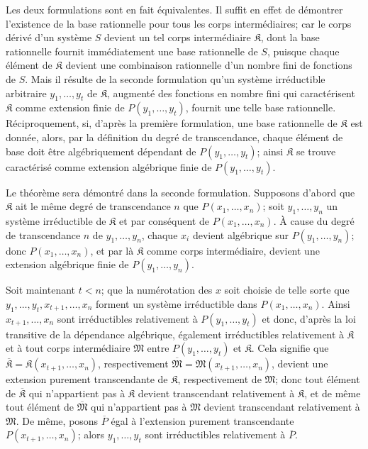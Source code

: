 Les deux formulations sont en fait équivalentes. Il suffit en effet de démontrer l'existence de la base rationnelle pour tous les corps intermédiaires; car le corps dérivé d'un système $S$ devient un tel corps intermédiaire $\mathfrak K$, dont la base rationnelle fournit immédiatement une base rationnelle de $S$, puisque chaque élément de $\mathfrak K$ devient une combinaison rationnelle d'un nombre fini de fonctions de $S$. Mais il résulte de la seconde formulation qu'un système irréductible arbitraire $y_1,\ldots,y_t$ de $\mathfrak K$, augmenté des fonctions en nombre fini qui caractérisent $\mathfrak K$ comme extension finie de $P(y_1,\ldots,y_t)$, fournit une telle base rationnelle. Réciproquement, si, d'après la première formulation, une base rationnelle de $\mathfrak K$ est donnée, alors, par la définition du degré de transcendance, chaque élément de base doit être algébriquement dépendant de $P(y_1,\ldots,y_t)$; ainsi $\mathfrak K$ se trouve caractérisé comme extension algébrique finie de $P(y_1,\ldots,y_t)$.

Le théorème sera démontré dans la seconde formulation. Supposons d'abord que $\mathfrak K$ ait le même degré de transcendance $n$ que $P(x_1,\ldots,x_n)$; soit $y_1,\ldots,y_n$ un système irréductible de $\mathfrak K$ et par conséquent de $P(x_1,\ldots,x_n)$. À cause du degré de transcendance $n$ de $y_1,\ldots,y_n$, chaque $x_i$ devient algébrique sur $P(y_1,\ldots,y_n)$; donc $P(x_1,\ldots,x_n)$, et par là $\mathfrak K$ comme corps intermédiaire, devient une extension algébrique finie de $P(y_1,\ldots,y_n)$.

Soit maintenant $t<n$; que la numérotation des $x$ soit choisie de telle sorte que $y_1,\ldots,y_t,x_{t+1},\ldots,x_n$ forment un système irréductible dans $P(x_1,\ldots,x_n)$. Ainsi $x_{t+1},\ldots,x_n$ sont irréductibles relativement à $P(y_1,\ldots,y_t)$ et donc, d'après la loi transitive de la dépendance algébrique, également irréductibles relativement à $\mathfrak K$ et à tout corps intermédiaire $\mathfrak M$ entre $P(y_1,\ldots,y_t)$ et $\mathfrak K$. Cela signifie que $\overline{\mathfrak K}=\mathfrak K(x_{t+1},\ldots,x_n)$, respectivement $\overline{\mathfrak M}=\mathfrak M(x_{t+1},\ldots,x_n)$, devient une extension purement transcendante de $\mathfrak K$, respectivement de $\mathfrak M$; donc tout élément de $\overline{\mathfrak K}$ qui n'appartient pas à $\mathfrak K$ devient transcendant relativement à $\mathfrak K$, et de même tout élément de $\overline{\mathfrak M}$ qui n'appartient pas à $\mathfrak M$ devient transcendant relativement à $\mathfrak M$. De même, posons $\overline P$ égal à l'extension purement transcendante $P(x_{t+1},\ldots,x_n)$; alors $y_1,\ldots,y_t$ sont irréductibles relativement à $\overline P$.

